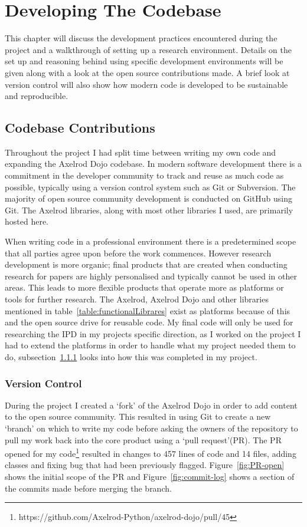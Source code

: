 \chapter{Developing The Codebase}\label{ch:developingthecodebase}
This chapter will discuss the development practices encountered during the project and a walkthrough of setting up a research environment.
Details on the set up and reasoning behind using specific development environments will be given along with a look at the open source contributions made.
A brief look at version control will also show how modern code is developed to be sustainable and reproducible.

\section{Codebase Contributions}
Throughout the project I had split time between writing my own code and expanding the Axelrod Dojo codebase. 
In modern software development there is a commitment in the developer community to track and reuse as much code as possible, typically using a version control system such as Git or Subversion.
The majority of open source community development is conducted on GitHub\cite{GitHub} using Git.
The Axelrod libraries, along with most other libraries I used, are primarily hosted here.

When writing code in a professional environment there is a predetermined scope that all parties agree upon before the work commences.  
However research development is more organic;
final products that are created when conducting research for papers are highly personalised and typically cannot be used in other areas.
This leads to more flexible products that operate more as platforms or tools for further research.
The Axelrod, Axelrod Dojo and other libraries mentioned in table~\ref{table:functionalLibrares} exist as platforms because of this and the open source drive for reusable code.
My final code will only be used for researching the IPD in my projects specific direction, as I worked on the project I had to extend the platforms in order to handle what my project needed them to do, subsection~\ref{ssec:versioncontrol} looks into how this was completed in my project.

\subsection{Version Control}\label{ssec:versioncontrol}
During the project I created a `fork' of the Axelrod Dojo in order to add content to the open source community. 
This resulted in using Git to create a new `branch' on which to write my code before asking the owners of the repository to pull my work back into the core product using a `pull request'(PR).
The PR opened for my code\footnote{https://github.com/Axelrod-Python/axelrod-dojo/pull/45} resulted in changes to 457 lines of code and 14 files, adding classes and fixing bug that had been previously flagged.
Figure~\ref{fig:PR-open} shows the initial scope of the PR and Figure~\ref{fig:commit-log} shows a section of the commits made before merging the branch.

